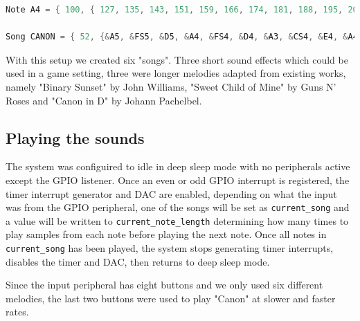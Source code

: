 \begin{minipage}{\linewidth}
\begin{lstlisting}[language=C, label=note-song, caption=Excerpts from music.c]
Note A4 = { 100, { 127, 135, 143, 151, 159, 166, 174, 181, 188, 195, 202, 208, 214, 220, 225, 230, 234, 239, 242, 245, 248, 250, 252, 253, 254, 254, 254, 254, 252, 251, 248, 246, 243, 239, 235, 231, 226, 220, 215, 209, 203, 196, 189, 182, 175, 167, 160, 152, 144, 136, 128, 120, 112, 104, 96, 89, 81, 74, 67, 60, 53, 47, 41, 35, 30, 25, 20, 16, 12, 9, 6, 4, 2, 1, 0, 0, 0, 0, 2, 3, 5, 8, 11, 15, 19, 23, 28, 33, 39, 44, 51, 57, 64, 71, 78, 86, 94, 101, 109, 117 } };

Song CANON = { 52, {&A5, &FS5, &D5, &A4, &FS4, &D4, &A3, &CS4, &E4, &A4, &CS5, &E5, &FS5, &D5, &B4, &FS4, &D4, &B3, &FS3, &A3, &CS4, &FS4, &A4, &CS5, &D5, &B4, &G4, &D4, &B3, &G3, &D3, &FS3, &A3, &D4, &FS4, &A4, &B4, &G4, &D4, &B3, &G3, &D3, &A3, &CS4, &E4, &A4, &CS5, &E5, &A5, &A5, &A5, &A5} };
\end{lstlisting}
\end{minipage}

With this setup we created six "songs". Three short sound effects which could be used in a game setting, three were longer melodies adapted from existing works, namely "Binary Sunset" by John Williams, "Sweet Child of Mine" by Guns N' Roses and "Canon in D" by Johann Pachelbel.

\subsection{Playing the sounds}
\label{playing-the-sounds}
The system was configuired to idle in deep sleep mode with no peripherals active except the GPIO listener. Once an even or odd GPIO interrupt is registered, the timer interrupt generator and DAC are enabled, depending on what the input was from the GPIO peripheral, one of the songs will be set as \texttt{current\_song} and a value will be written to \texttt{current\_note\_length} determining how many times to play samples from each note before playing the next note. Once all notes in \texttt{current\_song} has been played, the system stops generating timer interrupts, disables the timer and DAC, then returns to deep sleep mode.

Since the input peripheral has eight buttons and we only used six different melodies, the last two buttons were used to play "Canon" at slower and faster rates.

